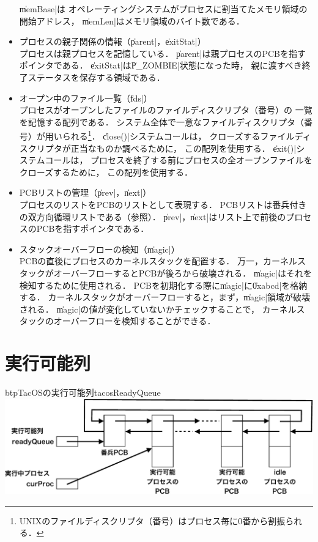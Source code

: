\begin{itemize}
  \|memBase|は
  オペレーティングシステムがプロセスに割当てたメモリ領域の開始アドレス，
  \|memLen|はメモリ領域のバイト数である．
\item プロセスの親子関係の情報（\|parent|，\|exitStat|） \\
  プロセスは親プロセスを記憶している．
  \|parent|は親プロセスのPCBを指すポインタである．
  \|exitStat|は\|P_ZOMBIE|状態になった時，
  親に渡すべき終了ステータスを保存する領域である．
\item オープン中のファイル一覧（\|fds|） \\
  プロセスがオープンしたファイルのファイルディスクリプタ（番号）の
  一覧を記憶する配列である．
  システム全体で一意なファイルディスクリプタ（番号）が用いられる\footnote{
    UNIXのファイルディスクリプタ（番号）はプロセス毎に0番から割振られる．}．
  \|close()|システムコールは，
  クローズするファイルディスクリプタが正当なものか調べるために，
  この配列を使用する．
  \|exit()|システムコールは，
  プロセスを終了する前にプロセスの全オープンファイルをクローズするために，
  この配列を使用する．
\item PCBリストの管理（\|prev|，\|next|） \\
  プロセスのリストをPCBのリストとして表現する．
  PCBリストは番兵付きの双方向循環リストである（参照）．
  \|prev|，\|next|はリスト上で前後のプロセスのPCBを指すポインタである．
\item スタックオーバーフローの検知（\|magic|） \\
  PCBの直後にプロセスのカーネルスタックを配置する．
  万一，カーネルスタックがオーバーフローするとPCBが後ろから破壊される．
  \|magic|はそれを検知するために使用される．
  PCBを初期化する際に\|magic|に\|0xabcd|を格納する．
  カーネルスタックがオーバーフローすると，まず，\|magic|領域が破壊される．
  \|magic|の値が変化していないかチェックすることで，
  カーネルスタックのオーバーフローを検知することができる．
\end{itemize}

\section{実行可能列}

\begin{myfig}{btp}{TacOSの実行可能列}{tacosReadyQueue}
  \includegraphics[scale=0.6]{Fig/tacosReadyQueue-crop.pdf}
\end{myfig}

